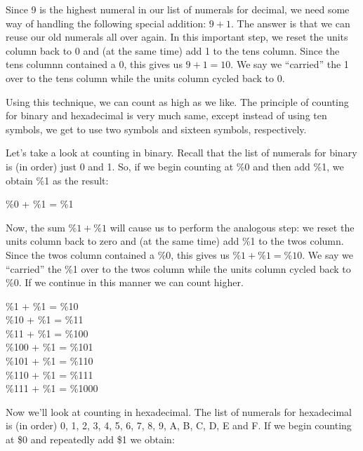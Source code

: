 Since 9 is the highest numeral in our list of numerals for decimal, we need some way of handling the following special addition: $9 + 1$. The answer is that we can reuse our old numerals all over again. In this important step, we reset the units column back to 0 and (at the same time) add 1 to the tens column. Since the tens columnn contained a 0, this gives us $9 + 1 = 10$. We say we ``carried'' the 1 over to the tens column while the units column cycled back to 0.

Using this technique, we can count as high as we like. The principle of counting for binary and hexadecimal is very much same, except instead of using ten symbols, we get to use two symbols and sixteen symbols, respectively.

Let's take a look at counting in binary. Recall that the list of numerals for binary is (in order) just 0 and 1. So, if we begin counting at \%0 and then add \%1, we obtain \%1 as the result:

\begin{center}
	\%0 + \%1 = \%1 \\
\end{center}

Now, the sum $\%1 + \%1$ will cause us to perform the analogous step: we reset the units column back to zero and (at the same time) add \%1 to the twos column. Since the twos column contained a \%0, this gives us $\%1 + \%1 = \%10$. We say we ``carried'' the \%1 over to the twos column while the units column cycled back to \%0. If we continue in this manner we can count higher.

\begin{center}
  \%1 + \%1 = \%10 \\
  \%10 + \%1 = \%11 \\
  \%11 + \%1 = \%100 \\
  \%100 + \%1 = \%101 \\
  \%101 + \%1 = \%110 \\
  \%110 + \%1 = \%111 \\
  \%111 + \%1 = \%1000 \\
\end{center}

Now we'll look at counting in hexadecimal. The list of numerals for hexadecimal is (in order) 0, 1, 2, 3, 4, 5, 6, 7, 8, 9, A, B, C, D, E and F. If we begin counting at \$0 and repeatedly add \$1 we obtain:


